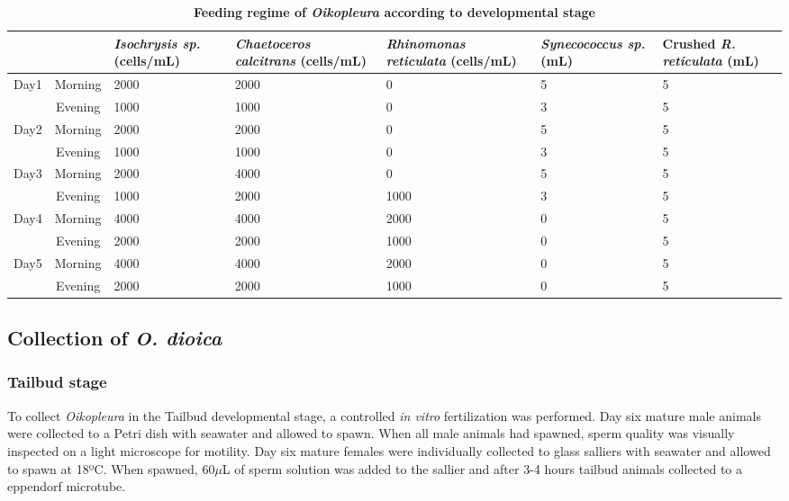 \documentclass[11pt,twoside,a4paper]{report}
\begin{document}
		\begin{table}[!ht]
       		\caption{\bf{Feeding regime of \textit{Oikopleura} according to developmental stage}}
        		\begin{center}
            		\begin{tabular}{| c | c | p{2.4cm} | p{2cm}|p{2cm} | p{2.2cm}|p{1.9cm} |}
                		\hline
		                \multicolumn{2}{|c|}{} & \textit{Isochrysis sp.} (cells/mL) & \textit{Chaetoceros calcitrans} (cells/mL) & \textit{Rhinomonas reticulata} (cells/mL) & \textit{Synecococcus sp.} (mL) & Crushed \textit{R. reticulata} (mL)\\
    		            \hline
        		        \multirow{2}{*}{Day1} 	& Morning & 2000 & 2000 & 0 & 5 & 5\\
        		        												& Evening & 1000 & 1000 & 0 & 3 & 5\\
        		        												 \hline
        		        \multirow{2}{*}{Day2} 	& Morning & 2000 & 2000 & 0 & 5 & 5\\
        		        												& Evening & 1000 & 1000 & 0 & 3 & 5\\
        		        												 \hline
        		        \multirow{2}{*}{Day3} 	& Morning & 2000 & 4000 & 0 & 5 & 5\\
        		        												& Evening & 1000 & 2000 & 1000 & 3 & 5\\
        		        												 \hline
        		        \multirow{2}{*}{Day4} 	& Morning & 4000 & 4000 & 2000 & 0 & 5\\
        		        												& Evening & 2000 & 2000 & 1000 & 0 & 5\\
        		        												 \hline
        		        \multirow{2}{*}{Day5} 	& Morning & 4000 & 4000 & 2000 & 0 & 5\\
        		        												& Evening & 2000 & 2000 & 1000 & 0 & 5\\
	                	\hline
	           		 \end{tabular}
    		    \end{center}
        		\label{table:ODculture}
		    \end{table}
		
		\subsection{Collection of \textit{O. dioica}}
			\subsubsection{Tailbud stage}
			To collect \textit{Oikopleura} in the Tailbud developmental stage, a controlled \textit{in vitro} fertilization was performed. Day six mature male animals were collected to a Petri dish with seawater and allowed to spawn. When all male animals had spawned, sperm quality was visually inspected on a light microscope for motility. Day six mature females were individually collected to glass salliers with seawater and allowed to spawn at 18ºC. When spawned, 60$\mu$L of sperm solution was added to the sallier and after 3-4 hours tailbud animals collected to a eppendorf microtube.
			
\end{document}
